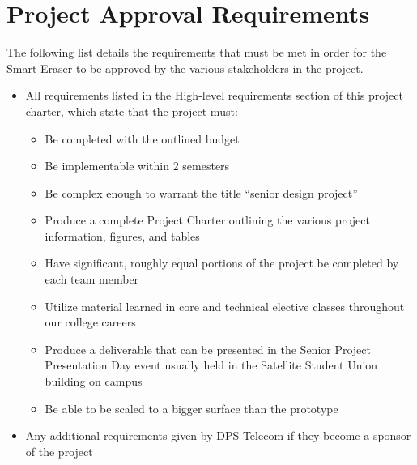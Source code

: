  \section{Project Approval Requirements}
 The following list details the requirements that must be met in order for the Smart Eraser to be approved by the various stakeholders in the project.
 \begin{itemize}
 	\item All requirements listed in the High-level requirements section of this project charter, which state that the project must:
 	\begin{itemize}
 		\item Be completed with the outlined budget
 		\item Be implementable within 2 semesters
 		\item Be complex enough to warrant the title ``senior design project''
 		\item Produce a complete Project Charter outlining the various project information, figures, and tables
 		\item Have significant, roughly equal portions of the project be completed by each team member
 		\item Utilize material learned in core and technical elective classes throughout our college careers
 		\item Produce a deliverable that can be presented in the Senior Project Presentation Day event usually held in the Satellite Student Union building on campus
 		\item Be able to be scaled to a bigger surface than the prototype
 	\end{itemize}
 	\item Any additional requirements given by DPS Telecom if they become a sponsor of the project
 \end{itemize}

